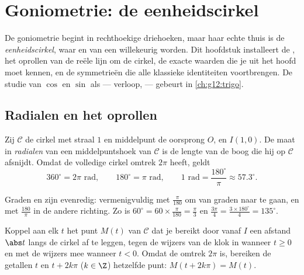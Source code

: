 \chapter{Goniometrie: de eenheidscirkel}\label{ch:g11:trigo}

De goniometrie begint in rechthoekige driehoeken, maar haar echte thuis is de
\emph{eenheidscirkel}, waar  en   van een willekeurig
 worden. Dit hoofdstuk installeert de , het oprollen van de
reële lijn om de cirkel, de exacte waarden die je uit het hoofd moet kennen,
en de symmetrieën die alle klassieke identiteiten voortbrengen. De studie van
$\cos$ en $\sin$ als  --- verloop,  --- gebeurt in
\cref{ch:g12:trigo}.

\section{Radialen en het oprollen}

\begin{definition}[Radiaal]\label{def:g11:trigo:radian}
Zij $\mathcal C$ de cirkel met straal $1$ en middelpunt de oorsprong $O$, en
$I(1, 0)$. De maat in \emph{radialen} van een middelpuntshoek
van $\mathcal C$ is de lengte van de boog die hij op $\mathcal C$ afsnijdt.
Omdat de volledige cirkel omtrek $2\pi$ heeft, geldt
\[
360^\circ = 2\pi \text{ rad},
\qquad
180^\circ = \pi \text{ rad},
\qquad
1 \text{ rad} = \frac{180^\circ}{\pi} \approx 57.3^\circ .
\]
\end{definition}

\begin{method}[Omrekenen]\label{met:g11:trigo:convert}
Graden en  zijn evenredig: vermenigvuldig met $\frac{\pi}{180}$ om
van graden naar  te gaan, en met $\frac{180}{\pi}$ in de andere
richting. Zo is $60^\circ = 60 \times \frac{\pi}{180} = \frac{\pi}{3}$ en
$\frac{3\pi}{4} = \frac{3 \times 180^\circ}{4} = 135^\circ$.
\end{method}

\begin{definition}\label{def:g11:trigo:winding}
Koppel aan elk  $t$ het punt $M(t)$ van $\mathcal C$ dat je
bereikt door vanaf $I$ een afstand $\abs t$ langs de cirkel af te leggen,
tegen de wijzers van de klok in wanneer $t \geq 0$ en met de wijzers mee
wanneer $t < 0$. Omdat de omtrek $2\pi$ is, bereiken de getallen $t$ en
$t + 2k\pi$ ($k \in \Z$) hetzelfde punt: $M(t + 2k\pi) = M(t)$.
\end{definition}

